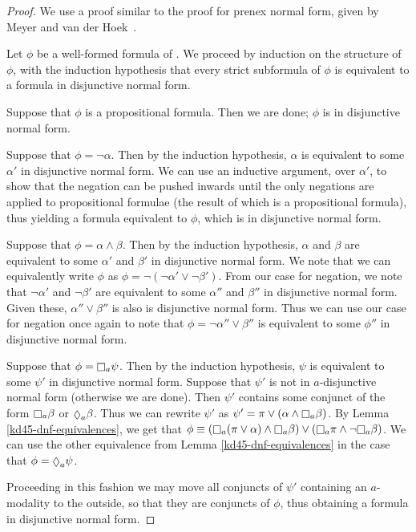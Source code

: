 \begin{proof}
We use a proof similar to the proof for prenex normal form, given by Meyer and
van der Hoek~\cite{meyer2004epistemic}.

Let $\phi$ be a well-formed formula of \logicKD{}. We proceed by induction on
the structure of $\phi$, with the induction hypothesis that every strict
subformula of $\phi$ is equivalent to a formula in disjunctive normal form.

Suppose that $\phi$ is a propositional formula. Then we are done; $\phi$ is in
disjunctive normal form.

Suppose that $\phi = \neg \alpha$. Then by the induction hypothesis, $\alpha$ is
equivalent to some $\alpha'$ in disjunctive normal form. We can use an inductive
argument, over $\alpha'$, to show that the negation can be pushed inwards until
the only negations are applied to propositional formulae (the result of which is
a propositional formula), thus yielding a formula equivalent to $\phi$, which is
in disjunctive normal form.

Suppose that $\phi = \alpha \land \beta$. Then by the induction hypothesis, $\alpha$
and $\beta$ are equivalent to some $\alpha'$ and $\beta'$ in disjunctive normal
form. We note that we can equivalently write $\phi$ as $\phi = \neg (\neg
\alpha' \lor \neg \beta')$. From our case for negation, we note that $\neg
\alpha'$ and $\neg \beta'$ are equivalent to some $\alpha''$ and $\beta''$ in
disjunctive normal form. Given these, $\alpha'' \lor \beta''$ is also is
disjunctive normal form. Thus we can use our case for negation once again to
note that $\phi = \neg \alpha'' \lor \beta''$ is equivalent to some $\phi''$ in
disjunctive normal form.

Suppose that $\phi = \knows_a \psi$. Then by the induction hypothesis, $\psi$ is
equivalent to some $\psi'$ in disjunctive normal form. Suppose that $\psi'$ is
not in $a$-disjunctive normal form (otherwise we are done). Then $\psi'$
contains some conjunct of the form $\knows_a \beta$ or $\suspects_a \beta$. Thus
we can rewrite $\psi'$ as $\psi' = \pi \lor (\alpha \land \knows_a \beta)$. By
Lemma \ref{kd45-dnf-equivalences}, we get that $\phi \equiv (\knows_a (\pi \lor
\alpha) \land \knows_a \beta) \lor (\knows_a \pi \land \neg \knows_a \beta)$. We
can use the other equivalence from Lemma \ref{kd45-dnf-equivalences} in the case
that $\phi = \suspects_a \psi$.

Proceeding in this fashion we may move all conjuncts of $\psi'$ containing an
$a$-modality to the outside, so that they are conjuncts of $\phi$, thus
obtaining a formula in disjunctive normal form.
\end{proof}

